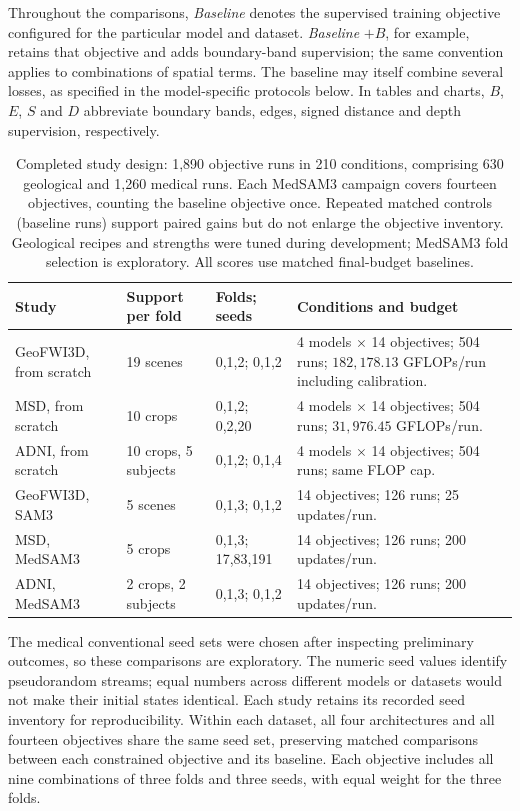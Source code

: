 \documentclass[12pt,a4paper]{article}
\begin{document}
Throughout the comparisons, \emph{Baseline} denotes the supervised training
objective configured for the particular model and dataset. \emph{Baseline}
$+B$, for example, retains that objective and adds boundary-band
supervision; the same convention applies to combinations of spatial terms.
The baseline may itself combine several losses, as specified in the
model-specific protocols below. In tables and charts, $B$, $E$, $S$ and $D$
abbreviate boundary bands, edges, signed distance and depth supervision,
respectively.

\begin{table}[htbp]
\centering\small{}
\begin{tabular}{@{}P{2.5cm}P{3.0cm}P{3.2cm}P{5.7cm}@{}}
\hline
Study & Support per fold & Folds; seeds & Conditions and budget \\
\hline
GeoFWI3D, from scratch & 19 scenes & 0,1,2; 0,1,2 & 4 models $\times$ 14 objectives; 504 runs; $182{,}178.13$ GFLOPs/run including calibration. \\[.5em]
MSD, from scratch & 10 crops & 0,1,2; 0,2,20 & 4 models $\times$ 14 objectives; 504 runs; $31{,}976.45$ GFLOPs/run. \\[.5em]
ADNI, from scratch & 10 crops, 5 subjects & 0,1,2; 0,1,4 & 4 models $\times$ 14 objectives; 504 runs; same FLOP cap. \\[.5em]
GeoFWI3D, SAM3 & 5 scenes & 0,1,3; 0,1,2 & 14 objectives; 126 runs; 25 updates/run. \\[.5em]
MSD, MedSAM3 & 5 crops & 0,1,3; 17,83,191 & 14 objectives; 126 runs; 200 updates/run. \\[.5em]
ADNI, MedSAM3 & 2 crops, 2 subjects & 0,1,3; 0,1,2 & 14 objectives; 126 runs; 200 updates/run. \\
\hline
\end{tabular}
\caption{Completed study design: 1,890 objective runs in 210 conditions,
comprising 630 geological and 1,260 medical runs.
Each MedSAM3 campaign covers fourteen objectives, counting the baseline
objective once. Repeated matched controls (baseline runs) support paired gains but do
not enlarge the objective inventory.
Geological recipes and strengths were tuned during development;
MedSAM3 fold selection is exploratory.
All scores use matched final-budget baselines.}
\label{tab:experimental-design}
\end{table}

The medical conventional seed sets were chosen after inspecting
preliminary outcomes, so these comparisons are exploratory.
The numeric seed values identify pseudorandom streams; equal numbers
across different models or datasets would not make their initial states
identical. Each study retains its recorded seed inventory for reproducibility.
Within each dataset, all four architectures and all fourteen objectives
share the same seed set,
preserving matched comparisons between each constrained objective and
its baseline. Each objective includes all nine combinations of three
folds and three seeds, with equal weight for the three folds.
\end{document}
